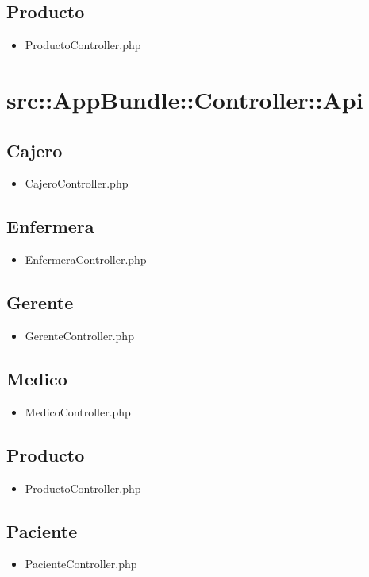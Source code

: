 	\subsection{Producto}
	\begin{itemize}
		\item ProductoController.php
	\end{itemize}
	\section{src::AppBundle::Controller::Api}
		\subsection{Cajero}
		\begin{itemize}
		\item CajeroController.php
		\end{itemize}
		\subsection{Enfermera}
		\begin{itemize}
		\item EnfermeraController.php
		\end{itemize}
		\subsection{Gerente}
		\begin{itemize}
		\item GerenteController.php
		\end{itemize}
		\subsection{Medico}
		\begin{itemize}
		\item MedicoController.php
		\end{itemize}
		\subsection{Producto}
		\begin{itemize}
		\item ProductoController.php
		\end{itemize}
		\subsection{Paciente}
		\begin{itemize}
		\item PacienteController.php
		\end{itemize}
